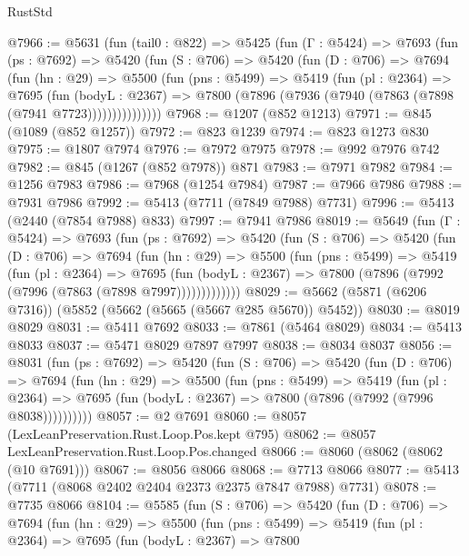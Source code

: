 \begin{lexlean}{RustStd}
\begin{coremodule}
@7966 := @5631
    (fun (tail0 : @822) =>
    @5425
      (fun (Γ : @5424) =>
      @7693
        (fun (ps : @7692) =>
        @5420
          (fun (S : @706) =>
          @5420
            (fun (D : @706) =>
            @7694
              (fun (hn : @29) =>
              @5500
                (fun (pns : @5499) =>
                @5419
                  (fun (pl : @2364) =>
                  @7695
                    (fun (bodyL : @2367) =>
                    @7800 (@7896 (@7936 (@7940 (@7863 (@7898 (@7941 @7723)))))))))))))))
@7968 := @1207 (@852 @1213)
@7971 := @845 (@1089 (@852 @1257))
@7972 := @823 @1239
@7974 := @823 @1273 @830
@7975 := @1807 @7974
@7976 := @7972 @7975
@7978 := @992 @7976 @742
@7982 := @845 (@1267 (@852 @7978)) @871
@7983 := @7971 @7982
@7984 := @1256 @7983
@7986 := @7968 (@1254 @7984)
@7987 := @7966 @7986
@7988 := @7931 @7986
@7992 := @5413 (@7711 (@7849 @7988) @7731)
@7996 := @5413 (@2440 (@7854 @7988) @833)
@7997 := @7941 @7986
@8019 := @5649
    (fun (Γ : @5424) =>
    @7693
      (fun (ps : @7692) =>
      @5420
        (fun (S : @706) =>
        @5420
          (fun (D : @706) =>
          @7694
            (fun (hn : @29) =>
            @5500
              (fun (pns : @5499) =>
              @5419
                (fun (pl : @2364) =>
                @7695
                  (fun (bodyL : @2367) =>
                  @7800 (@7896 (@7992 (@7996 (@7863 (@7898 @7997)))))))))))))
@8029 := @5662 (@5871 (@6206 @7316)) (@5852 (@5662 (@5665 (@5667 @285 @5670)) @5452))
@8030 := @8019 @8029
@8031 := @5411 @7692
@8033 := @7861 (@5464 @8029)
@8034 := @5413 @8033
@8037 := @5471 @8029 @7897 @7997
@8038 := @8034 @8037
@8056 := @8031
    (fun (ps : @7692) =>
    @5420
      (fun (S : @706) =>
      @5420
        (fun (D : @706) =>
        @7694
          (fun (hn : @29) =>
          @5500
            (fun (pns : @5499) =>
            @5419
              (fun (pl : @2364) =>
              @7695 (fun (bodyL : @2367) => @7800 (@7896 (@7992 (@7996 @8038))))))))))
@8057 := @2 @7691
@8060 := @8057 (LexLeanPreservation.Rust.Loop.Pos.kept @795)
@8062 := @8057 LexLeanPreservation.Rust.Loop.Pos.changed
@8066 := @8060 (@8062 (@8062 (@10 @7691)))
@8067 := @8056 @8066
@8068 := @7713 @8066
@8077 := @5413 (@7711 (@8068 @2402 @2404 @2373 @2375 @7847 @7988) @7731)
@8078 := @7735 @8066
@8104 := @5585
    (fun (S : @706) =>
    @5420
      (fun (D : @706) =>
      @7694
        (fun (hn : @29) =>
        @5500
          (fun (pns : @5499) =>
          @5419
            (fun (pl : @2364) =>
            @7695
              (fun (bodyL : @2367) =>
              @7800

\end{coremodule}
\end{lexlean}
